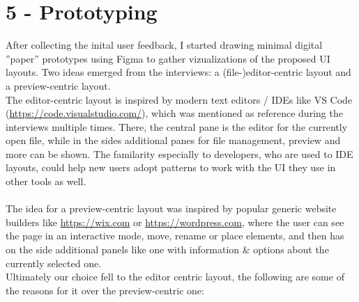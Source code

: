 
%
\chapter{5 - Prototyping}
\label{chap:chapters} 

After collecting the inital user feedback, I started drawing minimal digital ''paper'' prototypes using Figma to gather vizualizations of the proposed UI layouts.
Two ideas emerged from the interviews: a (file-)editor-centric layout and a preview-centric layout.
\\
The editor-centric layout is inspired by modern text editors / IDEs like VS Code (\url{https://code.visualstudio.com/}), which was mentioned as reference during the interviews multiple times.
There, the central pane is the editor for the currently open file, while in the sides additional panes for file management, preview and more can be shown.
The familarity especially to developers, who are used to IDE layouts, could help new users adopt patterns to work with the UI they use in other tools as well.
\\\\
The idea for a preview-centric layout was inspired by popular generic website builders like \url{https://wix.com} or \url{https://wordpress.com}, where the user
can see the page in an interactive mode, move, rename or place elements, and then has on the side additional panels like one with information \& options about the
currently selected one.
\\
Ultimately our choice fell to the editor centric layout, the following are some of the reasons for it over the preview-centric one:
